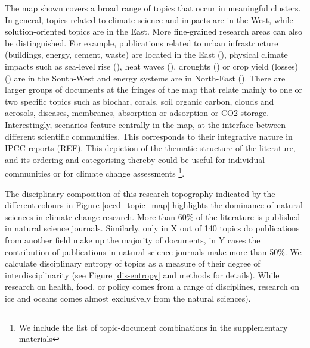 \documentclass{article}
\begin{document}
\begin{linenumbers}
		
		
		The map shown covers a broad range of topics that occur in meaningful clusters. In general, topics related to climate science and impacts are in the West, while solution-oriented topics are in the East. More fine-grained research areas can also be distinguished. For example, publications related to urban infrastructure (buildings, energy, cement, waste) are located in the East (), physical climate impacts such as sea-level rise (), heat waves (), droughts () or crop yield (losses) () are in the South-West and energy systems are in North-East (). There are larger groups of documents at the fringes of the map that relate mainly to one or two specific topics such as biochar, corals, soil organic carbon, clouds and aerosols, diseases, membranes, absorption or adsorption or CO2 storage. Interestingly, scenarios feature centrally in the map, at the interface between different scientific communities. This corresponds to their integrative nature in IPCC reports (REF). This depiction of the thematic structure of the literature, and its ordering and categorising thereby could be useful for individual communities or for climate change assessments \footnote{We include the list of topic-document combinations in the supplementary materials}.
		
		
		The disciplinary composition of this research topography indicated by the different colours in Figure \ref{oecd_topic_map} highlights the dominance of natural sciences in climate change research. More than 60\% of the literature is published in natural science journals. Similarly, only in X out of 140 topics do publications from another field make up the majority of documents, in Y cases the contribution of publications in natural science journals make more than 50\%. We calculate disciplinary entropy of topics as a measure of their degree of interdisciplinarity (see Figure \ref{dis-entropy} and methods for details). While research on health, food, or policy comes from a range of disciplines, research on ice and oceans comes almost exclusively from the natural sciences). 
		

\end{linenumbers}
\end{document}
